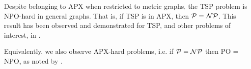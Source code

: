 
Despite belonging to APX when restricted to metric graphs, the TSP problem is NPO-hard in general graphs. That is, if TSP is in APX, then \(\mathcal{P} = \mathcal{NP}\). This result has been observed and demonstrated for TSP, and other problems of interest, in \cite{NPOcompleteApproxProblems}.

Equivalently, we also observe APX-hard problems, i.e. if \(\mathcal{P} = \mathcal{NP}\) then PO = NPO, as noted by \cite{ComplexityApproximation}.


